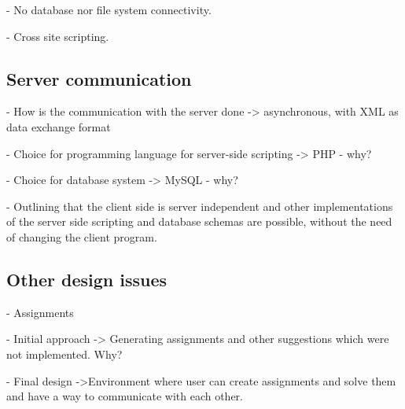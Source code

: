 - No database nor file system connectivity.

- Cross site scripting.

\subsection{Server communication}

- How is the communication with the server done 
-> asynchronous, with XML as data exchange format

- Choice for programming language for server-side scripting -> PHP - why?

- Choice for database system -> MySQL - why?

- Outlining that the client side is server independent and other 
implementations of the server side scripting and database schemas are possible, 
without the need of changing the client program.

\subsection{Other design issues}
- Assignments 
 
- Initial approach -> Generating assignments and other suggestions which were 
not implemented. Why?

- Final design ->Environment where user can create assignments and solve them 
and have a way to communicate with each other.
